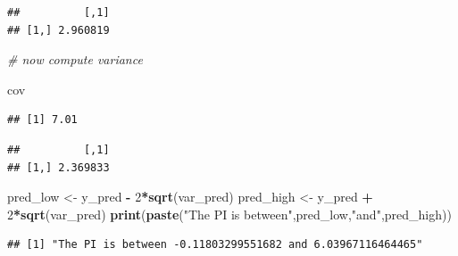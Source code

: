 \documentclass[]{article}
\newenvironment{Shaded}{\begin{snugshade}}{\end{snugshade}}
\newcommand{\KeywordTok}[1]{\textcolor[rgb]{0.13,0.29,0.53}{\textbf{#1}}}
\newcommand{\DecValTok}[1]{\textcolor[rgb]{0.00,0.00,0.81}{#1}}
\newcommand{\StringTok}[1]{\textcolor[rgb]{0.31,0.60,0.02}{#1}}
\newcommand{\CommentTok}[1]{\textcolor[rgb]{0.56,0.35,0.01}{\textit{#1}}}
\newcommand{\OperatorTok}[1]{\textcolor[rgb]{0.81,0.36,0.00}{\textbf{#1}}}
\newcommand{\NormalTok}[1]{#1}
\begin{document}
\begin{Shaded}
\end{Shaded}

\begin{verbatim}
##          [,1]
## [1,] 2.960819
\end{verbatim}

\begin{Shaded}
\begin{Highlighting}[]
\CommentTok{# now compute variance}

\NormalTok{cov}
\end{Highlighting}
\end{Shaded}

\begin{verbatim}
## [1] 7.01
\end{verbatim}

\begin{Shaded}
\end{Shaded}

\begin{verbatim}
##          [,1]
## [1,] 2.369833
\end{verbatim}

\begin{Shaded}
\begin{Highlighting}[]
\NormalTok{pred_low <-}\StringTok{ }\NormalTok{y_pred }\OperatorTok{-}\StringTok{ }\DecValTok{2}\OperatorTok{*}\KeywordTok{sqrt}\NormalTok{(var_pred)}
\NormalTok{pred_high <-}\StringTok{ }\NormalTok{y_pred }\OperatorTok{+}\StringTok{ }\DecValTok{2}\OperatorTok{*}\KeywordTok{sqrt}\NormalTok{(var_pred)}
\KeywordTok{print}\NormalTok{(}\KeywordTok{paste}\NormalTok{(}\StringTok{"The PI is between"}\NormalTok{,pred_low,}\StringTok{"and"}\NormalTok{,pred_high))}
\end{Highlighting}
\end{Shaded}

\begin{verbatim}
## [1] "The PI is between -0.11803299551682 and 6.03967116464465"
\end{verbatim}
\end{document}
